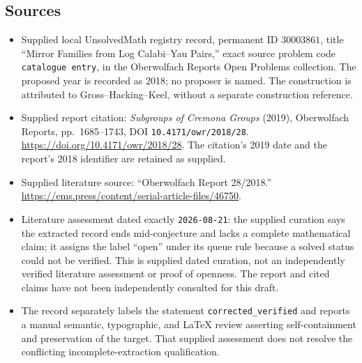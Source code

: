 \documentclass[11pt]{article}
\begin{document}
\subsection{Sources}
\begin{itemize}
\item Supplied local UnsolvedMath registry record, permanent ID \(30003861\), title ``Mirror Families from Log Calabi--Yau Pairs,'' exact source problem code \texttt{catalogue entry}, in the Oberwolfach Reports Open Problems collection. The proposed year is recorded as 2018; no proposer is named. The construction is attributed to Gross--Hacking--Keel, without a separate construction reference.
\item Supplied report citation: \emph{Subgroups of Cremona Groups} (2019), Oberwolfach Reports, pp.~1685--1743, DOI \texttt{10.4171/owr/2018/28}. \url{https://doi.org/10.4171/owr/2018/28}. The citation's 2019 date and the report's 2018 identifier are retained as supplied.
\item Supplied literature source: ``Oberwolfach Report 28/2018.'' \url{https://ems.press/content/serial-article-files/46750}.
\item Literature assessment dated exactly \texttt{2026-08-21}: the supplied curation says the extracted record ends mid-conjecture and lacks a complete mathematical claim; it assigns the label ``open'' under its queue rule because a solved status could not be verified. This is supplied dated curation, not an independently verified literature assessment or proof of openness. The report and cited claims have not been independently consulted for this draft.
\item The record separately labels the statement \texttt{corrected\_verified} and reports a manual semantic, typographic, and LaTeX review asserting self-containment and preservation of the target. That supplied assessment does not resolve the conflicting incomplete-extraction qualification.
\end{itemize}
\end{document}
